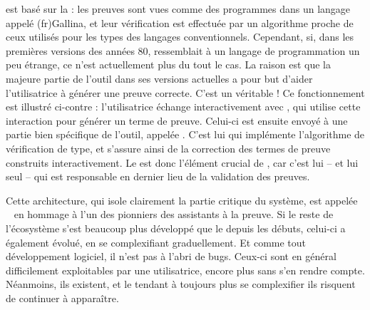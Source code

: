  est basé sur la  : les preuves sont vues comme des programmes dans un langage appelé \intro(fr){Gallina},
et leur vérification est effectuée par un algorithme proche
de ceux utilisés pour les types des langages conventionnels.
Cependant, si, dans les premières versions des années 80,  ressemblait à un langage de programmation un peu étrange, ce n’est actuellement plus du tout le cas.
La raison est que la majeure partie de l’outil dans ses versions actuelles a
pour but d’aider l’utilisatrice à générer une preuve correcte. C’est un véritable
 !
Ce fonctionnement est illustré ci-contre : l’utilisatrice échange interactivement avec , qui utilise cette interaction pour générer un terme de preuve. Celui-ci est ensuite envoyé à une partie bien spécifique de l’outil, appelée .
C’est lui qui implémente l’algorithme de vérification de type, et s’assure ainsi de la correction des termes de preuve construits interactivement.
Le  est donc l’élément crucial de , car c’est lui – et lui seul – qui est responsable en dernier lieu de la validation des preuves.

Cette architecture, qui isole clairement la partie critique du système,
est appelée ~ en 
hommage à l’un des pionniers des assistants à la preuve.
Si le reste de l’écosystème s’est beaucoup plus développé que le  depuis les débuts, celui-ci a également évolué, en se complexifiant graduellement.
Et comme tout développement logiciel, il n’est pas à l’abri de bugs.
Ceux-ci sont en général difficilement exploitables par une utilisatrice,
encore plus sans s’en rendre compte.
Néanmoins, ils existent,
et le  tendant à toujours plus se complexifier
ils risquent de continuer à apparaître.

